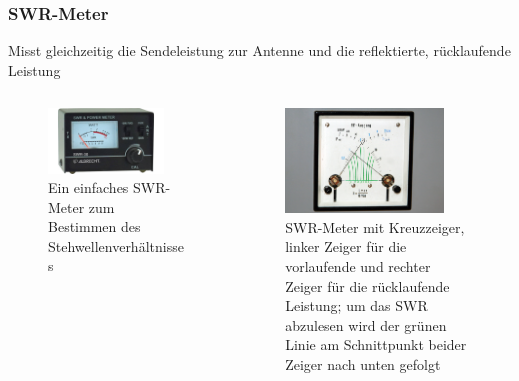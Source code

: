 \begin{frame}
\frametitle{SWR-Meter}
Misst gleichzeitig die Sendeleistung zur Antenne und die reflektierte, rücklaufende Leistung
\begin{columns}
    \begin{column}{0.48\textwidth}
    
\begin{figure}
    \includegraphics[width=0.85\textwidth]{foto/144}
    \caption{\scriptsize Ein einfaches SWR-Meter zum Bestimmen des Stehwellenverhältnisses}
    \label{swr_meter}
\end{figure}

    \end{column}
   \begin{column}{0.48\textwidth}
       
\begin{figure}
    \includegraphics[width=0.85\textwidth]{foto/143}
    \caption{\scriptsize SWR-Meter mit Kreuzzeiger, linker Zeiger für die vorlaufende und rechter Zeiger für die rücklaufende Leistung; um das SWR abzulesen wird der grünen Linie am Schnittpunkt beider Zeiger nach unten gefolgt}
    \label{swr_meter_kreuzzeiger}
\end{figure}

   \end{column}
\end{columns}

\end{frame}

